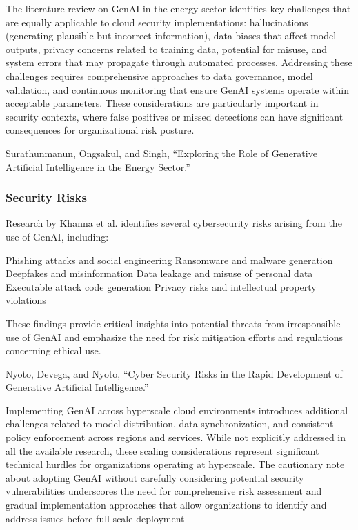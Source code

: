 The literature review on GenAI in the energy sector identifies key challenges that are equally applicable to cloud security implementations: hallucinations (generating plausible but incorrect information), data biases that affect model outputs, privacy concerns related to training data, potential for misuse, and system errors that may propagate through automated processes.
Addressing these challenges requires comprehensive approaches to data governance, model validation, and continuous monitoring that ensure GenAI systems operate within acceptable parameters. These considerations are particularly important in security contexts, where false positives or missed detections can have significant consequences for organizational risk posture.

Surathunmanun, Ongsakul, and Singh, “Exploring the Role of Generative Artificial Intelligence in the Energy Sector.”


\subsubsection{Security Risks} %
\label{sec:Security Risks}

Research by Khanna et al. identifies several cybersecurity risks arising from the use of GenAI, including:

Phishing attacks and social engineering
Ransomware and malware generation
Deepfakes and misinformation
Data leakage and misuse of personal data
Executable attack code generation
Privacy risks and intellectual property violations

These findings provide critical insights into potential threats from irresponsible use of GenAI and emphasize the need for risk mitigation efforts and regulations concerning ethical use.

Nyoto, Devega, and Nyoto, “Cyber Security Risks in the Rapid Development of Generative Artificial Intelligence.”

Implementing GenAI across hyperscale cloud environments introduces additional challenges related to model distribution, data synchronization, and consistent policy enforcement across regions and services. While not explicitly addressed in all the available research, these scaling considerations represent significant technical hurdles for organizations operating at hyperscale.
The cautionary note about adopting GenAI without carefully considering potential security vulnerabilities underscores the need for comprehensive risk assessment and gradual implementation approaches that allow organizations to identify and address issues before full-scale deployment

